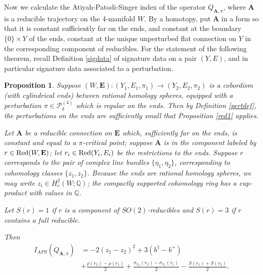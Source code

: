\documentclass[10pt,a4paper]{amsart}
\newtheorem{proposition}[theorem]{Proposition}
\theoremstyle{definition}
\theoremstyle{remark}
\numberwithin{figure}{qchap}
\begin{document}
Now we calculate the Atiyah-Patodi-Singer index of the operator $Q_{\mathbf{A},\pi}$, where $\mathbf{A}$ is a reducible trajectory on the 4-manifold $W$. By a homotopy, put $\mathbf{A}$ in a form so that it is constant sufficiently far on the ends, and constant at the boundary $\{0\} \times Y$ of the ends, constant at the unique unperturbed flat connection on $Y$ in the corresponding component of reducibles. For the statement of the following theorem, recall Definition \ref{sigdata} of signature data on a pair $(Y,E)$, and in particular signature data associated to a perturbation.

\begin{proposition}\label{index-calculation}
Suppose $(W,\mathbf{E}): (Y_1, E_1,\pi_1) \to (Y_2, E_2,\pi_2)$ is a cobordism (with cylindrical ends) between rational homology spheres, equipped with a perturbation $\pi \in \mathcal P^{(4)}_{\delta}$ which is regular on the ends. Then by Definition \ref{pertdef}, the perturbations on the ends are sufficiently small that Proposition \ref{red1} applies. 

Let $\mathbf{A}$ be a reducible connection on $\mathbf{E}$ which, sufficiently far on the ends, is constant and equal to a $\pi$-critical point; suppose $\mathbf{A}$ is in the component labeled by $r \in \textup{Red}(W,\mathbf{E})$; let $r_i \in \textup{Red}(Y_i,E_i)$ be the restrictions to the ends. Suppose $r$ corresponds to the pair of complex line bundles $\{\eta_1, \eta_2\}$, corresponding to cohomology classes $\{z_1, z_2\}$. Because the ends are rational homology spheres, we may write $z_i \in H^2_c(W;\mathbb Q)$; the compactly supported cohomology ring has a cup-product with values in $\mathbb Q$.

Let $S(r) = 1$ if $r$ is a component of $SO(2)$-reducibles and $S(r) = 3$ if $r$ contains a full reducible.

Then 
\begin{align*}I_{APS}(Q_{\mathbf{A},\pi}) &= -2(z_1 - z_2)^2 +3(b^1-b^+) \\
&+ \frac{\rho(r_2) - \rho(r_1)}{2} + \frac{\sigma_{\pi_2}(r_2) - \sigma_{\pi_1}(r_1)}{2} - \frac{S(r_1) + S(r_2)}{2}.
\end{align*}
\end{proposition}
\end{document}
